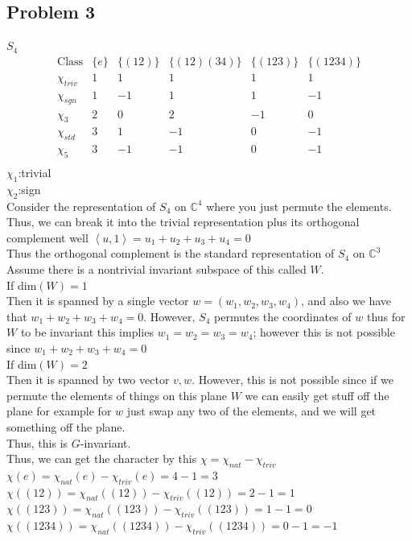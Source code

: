 \documentclass[12pt, letterpaper]{article}
\theoremstyle{definition}
\newcommand{\C}{\mathbb{C}}
\newcommand{\ang}[1]{\left\langle #1 \right\rangle}
\begin{document}
\subsection*{Problem 3}
\large$S_4$
\[
\begin{array}{c|ccccc}
\text{Class} & \{e\} & \{(12)\} & \{(12)(34)\} & \{(123)\} & \{(1234)\} \\
\hline
\chi_{triv} & 1 & 1 & 1 & 1 & 1 \\
\chi_{sgn} & 1 & -1 & 1 & 1 & -1 \\
\chi_3 & 2 & 0 & 2 & -1 & 0 \\
\chi_{std} & 3 & 1 & -1 & 0 & -1 \\
\chi_5 & 3 & -1 & -1 & 0 & -1 \\
\end{array}
\]
$\chi_1$:trivial\\
$\chi_2$:sign\\
Consider the representation of $S_4$ on $\C^4$ where you just permute the elements.
Thus, we can break it into the trivial representation plus its orthogonal complement well $\ang{u,1}=u_1+u_2+u_3+u_4=0$\\
Thus the orthogonal complement is the standard representation of $S_4$ on $\C^3$\\
Assume there is a nontrivial invariant subspace of this called $W$.\\
If dim$(W)=1$\\
Then it is spanned by a single vector $w=(w_1,w_2,w_3,w_4)$, and also we have that $w_1+w_2+w_3+w_4=0$.
However, $S_4$ permutes the coordinates of $w$ thus for $W$ to be invariant this implies $w_1=w_2=w_3=w_4$; however this is not possible since $w_1+w_2+w_3+w_4=0$\\
If dim$(W)=2$\\
Then it is spanned by two vector $v,w$. However, this is not possible since if we permute the elements of things on this plane $W$ we can easily get stuff off the plane for example for $w$ just swap any two of the elements, and we will get something off the plane.\\
Thus, this is $G$-invariant.\\
Thus, we can get the character by this $\chi = \chi_{nat}-\chi_{triv}$\\
$\chi(e)=\chi_{nat}(e)-\chi_{triv}(e)=4-1=3$\\
$\chi((12))=\chi_{nat}((12))-\chi_{triv}((12))=2-1=1$\\
$\chi((123))=\chi_{nat}((123))-\chi_{triv}((123))=1-1=0$\\
$\chi((1234))=\chi_{nat}((1234))-\chi_{triv}((1234))=0-1=-1$\\
\end{document}
